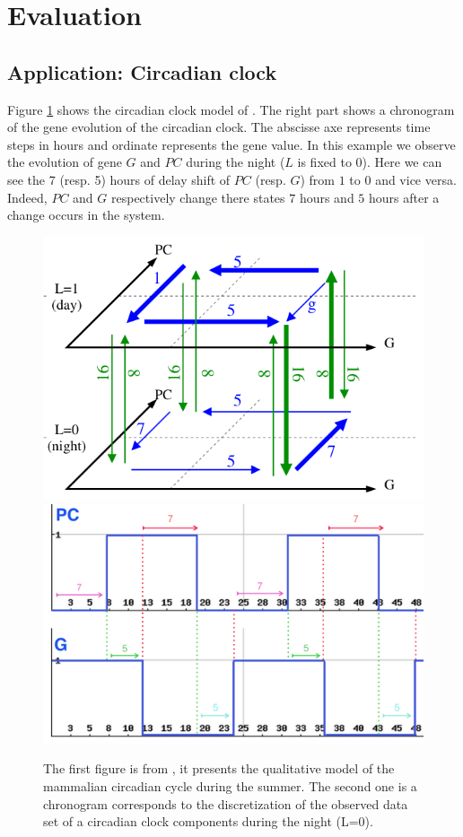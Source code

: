 \section{Evaluation}
\label{sec:evaluation}
\subsection{Application: Circadian clock}

Figure \ref{fig:circadian_clock} shows the circadian clock model of \cite{comet2012simplified}.
The right part shows a chronogram of the gene evolution of the circadian clock.
The abscisse axe represents time steps in hours and ordinate represents the gene value.
In this example we observe the evolution of gene $G$ and $PC$ during the night ($L$ is fixed to 0).
Here we can see the 7 (resp. 5) hours of delay shift of $PC$ (resp. $G$) from $1$ to $0$ and vice versa.
Indeed, $PC$ and $G$ respectively change there states $7$ hours and $5$ hours after a change occurs in the system.

\begin{figure}[tb]
\begin{center}
\includegraphics[width=0.4\linewidth]{images/circadianClock-summer.png}
\includegraphics[width=0.4\linewidth]{images/circadianClock-Courb.png}
\end{center}
\caption{The first figure is from \cite{comet2010formal}, it presents the qualitative model of the mammalian circadian cycle during the summer. The second one is a chronogram corresponds to the discretization of the observed data set of a circadian clock components during the night (L=0).}
\label{fig:circadian_clock}
\end{figure}

